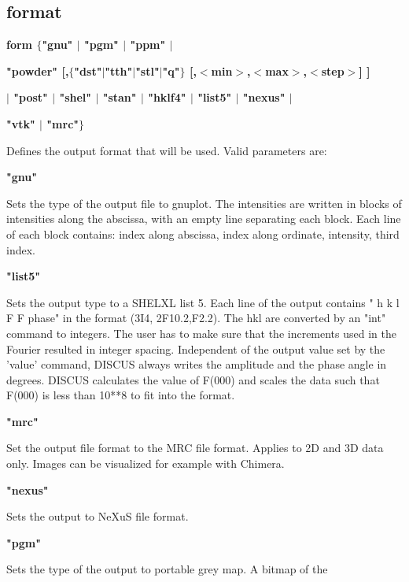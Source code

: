 \subsection*{format}
{\bf form $ \{$"gnu" $| $ "pgm" $| $ "ppm" $| $ \par }
{\bf       "powder" [,$ \{$"dst"$| $"tth"$| $"stl"$| $"q"$\} $ [,$ <$min$> $,$ <$max$> $,$ <$step$> $] ] \par }
{\bf     $| $ "post" $| $ "shel" $| $ "stan" $| $ "hklf4" $| $ "list5" $| $ "nexus" $| $ \par }
{\bf       "vtk" $| $ "mrc"$\} $ \par }
\par
\vspace{3pt}
Defines the output format that will be used. 
Valid parameters are: 
\par
{\bf "gnu" \par }
\vspace{3pt}
Sets the type of the output file to gnuplot. The intensities are 
written in blocks of intensities along the abscissa, with an empty 
line separating each block. Each line of each block contains: 
index along abscissa, index along ordinate, intensity, third index. 
\par
{\bf "list5" \par }
\vspace{3pt}
Sets the output type to a SHELXL list 5. Each line of the output 
contains " h k l F F phase" in the format (3I4, 2F10.2,F2.2). 
The hkl are converted by an "int" command to integers. The 
user has to make sure that the increments used in the Fourier 
resulted in integer spacing. 
Independent of the output value set by the 'value' command, DISCUS 
always writes the amplitude and the phase angle in degrees. 
DISCUS calculates the value of F(000) and scales the data such 
that F(000) is less than 10**8 to fit into the format. 
\par
{\bf "mrc" \par }
\vspace{3pt}
Set the output file format to the MRC file format. Applies to 
2D and 3D data only. Images can be visualized for example with 
Chimera. 
\par
{\bf "nexus" \par }
\vspace{3pt}
Sets the output to NeXuS file format. 
\par
{\bf "pgm" \par }
\vspace{3pt}
Sets the type of the output to portable grey map. A bitmap of the 
